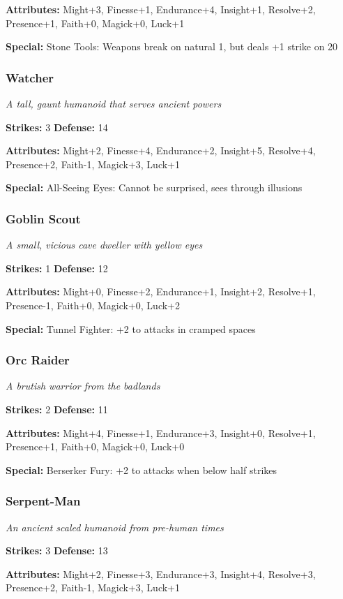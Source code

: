 \documentclass[10pt,twoside]{article}
\begin{document}
\textbf{Attributes:} Might+3, Finesse+1, Endurance+4, Insight+1, Resolve+2, Presence+1, Faith+0, Magick+0, Luck+1

\textbf{Special:} Stone Tools: Weapons break on natural 1, but deals +1 strike on 20

\subsubsection{Watcher}
\textit{A tall, gaunt humanoid that serves ancient powers}

\textbf{Strikes:} 3 \quad \textbf{Defense:} 14

\textbf{Attributes:} Might+2, Finesse+4, Endurance+2, Insight+5, Resolve+4, Presence+2, Faith-1, Magick+3, Luck+1

\textbf{Special:} All-Seeing Eyes: Cannot be surprised, sees through illusions

\subsubsection{Goblin Scout}
\textit{A small, vicious cave dweller with yellow eyes}

\textbf{Strikes:} 1 \quad \textbf{Defense:} 12

\textbf{Attributes:} Might+0, Finesse+2, Endurance+1, Insight+2, Resolve+1, Presence-1, Faith+0, Magick+0, Luck+2

\textbf{Special:} Tunnel Fighter: +2 to attacks in cramped spaces

\subsubsection{Orc Raider}
\textit{A brutish warrior from the badlands}

\textbf{Strikes:} 2 \quad \textbf{Defense:} 11

\textbf{Attributes:} Might+4, Finesse+1, Endurance+3, Insight+0, Resolve+1, Presence+1, Faith+0, Magick+0, Luck+0

\textbf{Special:} Berserker Fury: +2 to attacks when below half strikes

\subsubsection{Serpent-Man}
\textit{An ancient scaled humanoid from pre-human times}

\textbf{Strikes:} 3 \quad \textbf{Defense:} 13

\textbf{Attributes:} Might+2, Finesse+3, Endurance+3, Insight+4, Resolve+3, Presence+2, Faith-1, Magick+3, Luck+1
\end{document}
